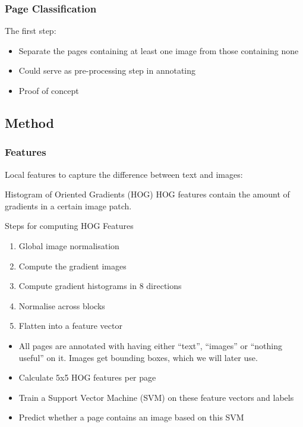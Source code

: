 %
\begin{frame}
\frametitle{Page Classification}
The first step:
\begin{itemize}
\item Separate the pages containing at least one image from those
containing none
\item Could serve as pre-processing step in annotating
\item Proof of concept
\end{itemize}
\end{frame}



\subsection{Method}

\begin{frame}
\frametitle{Features}
Local features to capture the difference between text and images:
	\begin{block}{Histogram of Oriented Gradients (HOG)}
		HOG features contain the amount of gradients in a certain image patch.
	\end{block}
	\begin{block}{Steps for computing HOG Features\cite{dalal2005histograms}}
	\begin{enumerate}
		\item Global image normalisation
		\item Compute the gradient images
		\item Compute gradient histograms in 8 directions
		\item Normalise across blocks
		\item Flatten into a feature vector
	\end{enumerate}
	\end{block}
\end{frame}


{
	\begin{itemize}
		\item All pages are annotated with having either ``text'', ``images'' or
		``nothing useful'' on it. Images get bounding boxes, which we will later
		use.
		\item Calculate 5x5 HOG features per page
		\item Train a Support Vector Machine (SVM) on these feature vectors and
		labels
		\item Predict whether a page contains an image based on this SVM
	\end{itemize}
}

